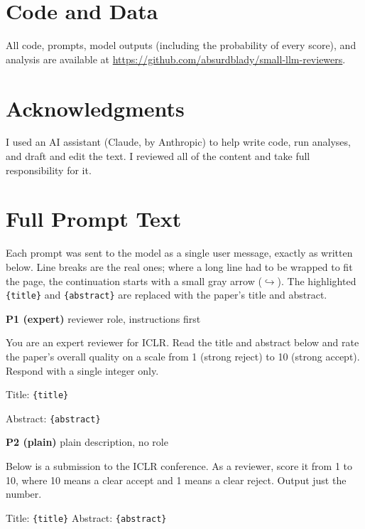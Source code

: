 \documentclass[11pt]{article}
\newcommand{\slot}[1]{\textcolor{blue!55!black}{\texttt{\{#1\}}}}
\newif\ifanonymous
\newcommand{\fillme}[1]{\textcolor{red}{[#1]}}
\begin{document}
\section*{Code and Data}
All code, prompts, model outputs (including the probability of every score), and analysis are available at \ifanonymous \fillme{anonymized repository link}\else \url{https://github.com/absurdblady/small-llm-reviewers}\fi.

\section*{Acknowledgments}
I used an AI assistant (Claude, by Anthropic) to help write code, run analyses, and draft and edit the text. I reviewed all of the content and take full responsibility for it.




\clearpage
\appendix

\section{Full Prompt Text}
\label{app:prompts}
Each prompt was sent to the model as a single user message, exactly as written below. Line breaks are the real ones; where a long line had to be wrapped to fit the page, the continuation starts with a small gray arrow ($\hookrightarrow$). The highlighted \slot{title} and \slot{abstract} are replaced with the paper's title and abstract.

\begin{promptbox}{\textbf{P1 (expert)} \enspace reviewer role, instructions first}
\begin{prompttext}
You are an expert reviewer for ICLR. Read the title and abstract below and rate the paper's overall quality on a scale from 1 (strong reject) to 10 (strong accept). Respond with a single integer only.

Title: \slot{title}

Abstract: \slot{abstract}
\end{prompttext}
\end{promptbox}

\begin{promptbox}{\textbf{P2 (plain)} \enspace plain description, no role}
\begin{prompttext}
Below is a submission to the ICLR conference. As a reviewer, score it from 1 to 10, where 10 means a clear accept and 1 means a clear reject. Output just the number.

Title: \slot{title}
Abstract: \slot{abstract}
\end{prompttext}
\end{promptbox}
\end{document}
